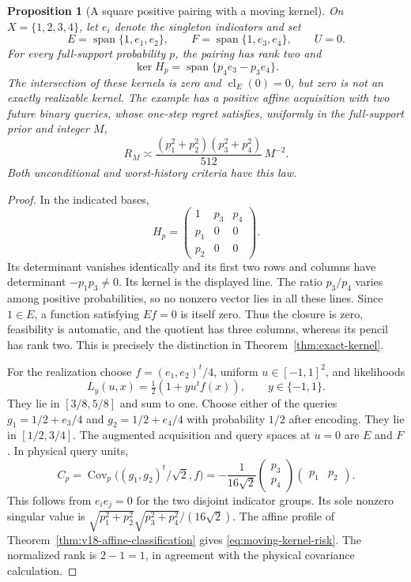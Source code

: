 \documentclass[11pt]{amsart}
\newtheorem{proposition}[theorem]{Proposition}
\theoremstyle{definition}\newtheorem{definition}[theorem]{Definition}
\theoremstyle{remark}\newtheorem{remark}[theorem]{Remark}
\begin{document}
\begin{proposition}[A square positive pairing with a moving kernel]
\label{prop:square-moving-kernel}
On $X=\{1,2,3,4\}$, let $e_i$ denote the singleton indicators and set
\[
 E=\operatorname{span}\{1,e_1,e_2\},\qquad
 F=\operatorname{span}\{1,e_3,e_4\},\qquad U=0.
\]
For every full-support probability $p$, the pairing has rank two and
\[
 \ker H_p=\operatorname{span}\{p_4e_3-p_3e_4\}.
\]
The intersection of these kernels is zero and $\operatorname{cl}_E(0)=0$,
but zero is not an exactly realizable kernel. The example has a positive
affine acquisition with two future binary queries, whose one-step
regret satisfies, uniformly in the full-support prior and integer $M$,
\begin{equation}\label{eq:moving-kernel-risk}
 R_M\asymp
 \frac{(p_1^2+p_2^2)(p_3^2+p_4^2)}{512}\,M^{-2}.
\end{equation}
Both unconditional and worst-history criteria have this law.
\end{proposition}
\begin{proof}
In the indicated bases,
\[
 H_p=\begin{pmatrix}1&p_3&p_4\\p_1&0&0\\p_2&0&0\end{pmatrix}.
\]
Its determinant vanishes identically and its first two rows and columns
have determinant $-p_1p_3\ne0$. Its kernel is the displayed line.
The ratio $p_3/p_4$ varies among positive probabilities, so no nonzero
vector lies in all these lines. Since $1\in E$, a function satisfying
$Ef=0$ is itself zero. Thus the closure is zero, feasibility is automatic,
and the quotient has three columns, whereas its pencil has rank two.
This is precisely the distinction in Theorem~\ref{thm:exact-kernel}.

For the realization choose $f=(e_1,e_2)^t/4$, uniform
$u\in[-1,1]^2$, and likelihoods
\[
 L_y(u,x)=\tfrac12(1+y u^tf(x)),\qquad y\in\{-1,1\}.
\]
They lie in $[3/8,5/8]$ and sum to one. Choose either of the queries
$g_1=1/2+e_3/4$ and $g_2=1/2+e_4/4$ with probability $1/2$
after encoding. They lie in $[1/2,3/4]$. The augmented acquisition
and query spaces at $u=0$ are $E$ and $F$. In physical query units,
\[
 C_p=\operatorname{Cov}_p\bigl((g_1,g_2)^t/\sqrt2,f\bigr)
 =-\frac1{16\sqrt2}
       \begin{pmatrix}p_3\\p_4\end{pmatrix}
       \begin{pmatrix}p_1&p_2\end{pmatrix}.
\]
This follows from $e_i e_j=0$ for the two disjoint indicator groups.
Its sole nonzero singular value is
$\sqrt{p_1^2+p_2^2}\sqrt{p_3^2+p_4^2}/(16\sqrt2)$.
The affine profile of Theorem~\ref{thm:v18-affine-classification} gives
\eqref{eq:moving-kernel-risk}. The normalized rank is $2-1=1$,
in agreement with the physical covariance calculation.
\end{proof}
\end{document}
